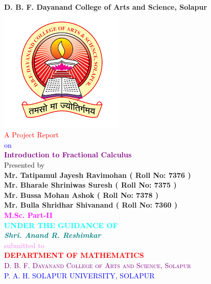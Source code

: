 \documentclass[a4paper,14pt,oneside]{book}
\theoremstyle{plain}
\theoremstyle{definition}
\theoremstyle{remark}
\begin{document}
\begin{titlepage}
\begin{center}
\vspace*{0.3cm}
\huge
\textbf{\color{blue!70!green}D. B. F. Dayanand College of Arts and Science, Solapur}\\
\vspace{0.1cm}\includegraphics[scale=0.4]{College}\\
\Large{
\textcolor{red}{A Project Report} \\ \textcolor{blue}{on}}\\
\vspace{0.5cm}\textcolor{purple}{\Huge {\textbf{Introduction to Fractional Calculus}}}\\
\textcolor{green!30!blue}{Presented by} \\\textbf{\textcolor{Orchid!150!}{Mr. Tatipamul Jayesh Ravimohan ( Roll No: 7376 ) \\ Mr. Bharale Shriniwas Suresh ( Roll No: 7375 ) \\ Mr. Bussa Mohan Ashok ( Roll No: 7378 ) \\  Mr. Bulla Shridhar Shivanand ( Roll No: 7360 )}}\\\huge{\textbf{\textcolor{magenta}{M.Sc. Part-II}}}\\
\textbf{\textcolor{cyan}{UNDER THE GUIDANCE OF}}\\
\textcolor{teal}{\textit {\textbf{Shri. Anand R. Reshimkar}}}\\
\textcolor{violet}{submitted to}\\
\textbf{\textcolor{red}{\LARGE{DEPARTMENT OF MATHEMATICS}}}\\
\textcolor{purple}{\textsc{D. B. F. Dayanand College of Arts and Science, Solapur}}\\
\textcolor{blue}{P. A. H. SOLAPUR UNIVERSITY, SOLAPUR}


\end{center}
\end{titlepage}
\end{document}
